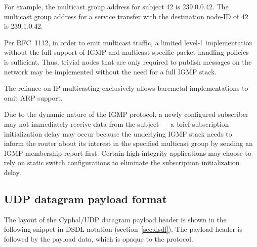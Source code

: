 \begin{remark}
    For example, the multicast group address for subject 42 is 239.0.0.42.
    The multicast group address for a service transfer with the destination node-ID of 42 is 239.1.0.42.
\end{remark}

\begin{remark}
    Per RFC~1112, in order to emit multicast traffic,
    a limited level-1 implementation without the full support of IGMP and multicast-specific packet handling policies
    is sufficient.
    Thus, trivial nodes that are only required to publish messages on the network may be implemented
    without the need for a full IGMP stack.

    The reliance on IP multicasting exclusively allows baremetal implementations to omit ARP support.
\end{remark}

\begin{remark}
    Due to the dynamic nature of the IGMP protocol,
    a newly configured subscriber may not immediately receive data from the subject ---
    a brief subscription initialization delay may occur
    because the underlying IGMP stack needs to inform the router about its interest
    in the specified multicast group by sending an IGMP membership report first.
    Certain high-integrity applications may choose to rely on static switch configurations
    to eliminate the subscription initialization delay.
\end{remark}

\subsection{UDP datagram payload format}

The layout of the Cyphal/UDP datagram payload header is shown in the following snippet in DSDL notation
(section~\ref{sec:dsdl}).
The payload header is followed by the payload data, which is opaque to the protocol.

